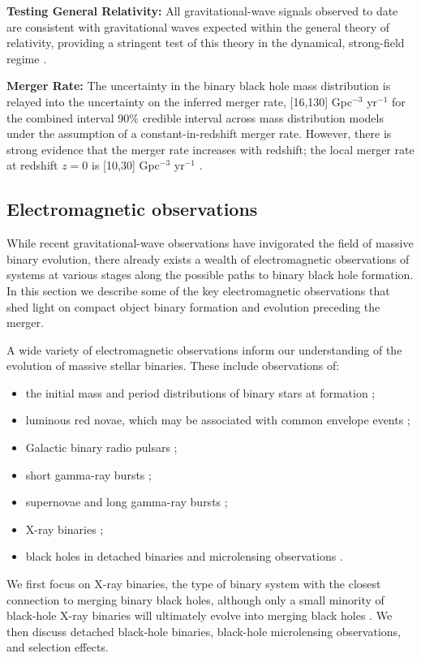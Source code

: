 \documentclass[review]{elsarticle}
\begin{document}
\textbf{Testing General Relativity:} All gravitational-wave signals observed to date are consistent with gravitational waves expected within the general theory of relativity, providing a stringent test of this theory in the dynamical, strong-field regime \citep{GW150914:GR,GWTC2:GR}.

\textbf{Merger Rate:} The uncertainty in the binary black hole mass distribution is relayed into the uncertainty on the inferred merger rate, [16,130]  Gpc$^{-3}$ yr$^{-1}$ for the combined interval 90\% credible interval across mass distribution models under the assumption of a constant-in-redshift merger rate.  However, there is strong evidence that the merger rate increases with redshift; the local merger rate at redshift $z=0$ is [10,30]  Gpc$^{-3}$ yr$^{-1}$  \citep{GWTC3:pop}.  

\subsection{Electromagnetic observations}

While recent gravitational-wave observations have invigorated the field of massive binary evolution, there already exists a wealth of electromagnetic observations of systems at various stages along the possible paths to binary black hole formation. In this section we describe some of the key electromagnetic observations that shed light on compact object binary formation and evolution preceding the merger.

A wide variety of electromagnetic observations inform our understanding of the evolution of massive stellar binaries. These include observations of: 
\begin{itemize}
\item the initial mass and period distributions of binary stars at formation \citep[e.g.,][]{Sana:2012,MoeDiStefano:2017}; 
\item luminous red novae, which may be associated with common envelope events \citep[e.g.,][]{Ivanova:2013LRN,Howitt:2020};
\item Galactic binary radio pulsars \citep[e.g.,][]{Tauris:2017};
\item short gamma-ray bursts \citep[e.g.,][]{Berger:2014};
\item supernovae and long gamma-ray bursts \citep[e.g.,][]{Cantiello:2007,Szecsi:2017,Bavera:2021};
\item X-ray binaries \citep[e.g.,][]{TaurisvdH:2006};
\item black holes in detached binaries \citep[e.g.,][]{Thompson:2019} and microlensing observations \citep[e.g.,][]{WyrzykowskiMandel:2019}.
\end{itemize}
We first focus on X-ray binaries, the type of binary system with the closest connection to merging binary black holes, although only a small minority of black-hole X-ray binaries will ultimately evolve into merging black holes \citep[e.g.,][]{CygnusX3:2012,Neijssel:2020CygX1}. We then discuss detached black-hole binaries, black-hole microlensing observations, and selection effects.
\end{document}

